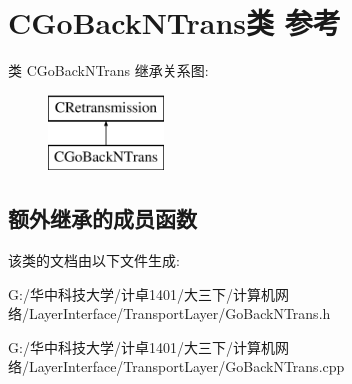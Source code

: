 \hypertarget{class_c_go_back_n_trans}{}\section{C\+Go\+Back\+N\+Trans类 参考}
\label{class_c_go_back_n_trans}
类 C\+Go\+Back\+N\+Trans 继承关系图\+:\begin{figure}[H]
\begin{center}
\leavevmode
\includegraphics[height=2.000000cm]{class_c_go_back_n_trans}
\end{center}
\end{figure}
\subsection*{额外继承的成员函数}


该类的文档由以下文件生成\+:\begin{DoxyCompactItemize}
\item 
G\+:/华中科技大学/计卓1401/大三下/计算机网络/\+Layer\+Interface/\+Transport\+Layer/Go\+Back\+N\+Trans.\+h\item 
G\+:/华中科技大学/计卓1401/大三下/计算机网络/\+Layer\+Interface/\+Transport\+Layer/Go\+Back\+N\+Trans.\+cpp\end{DoxyCompactItemize}
